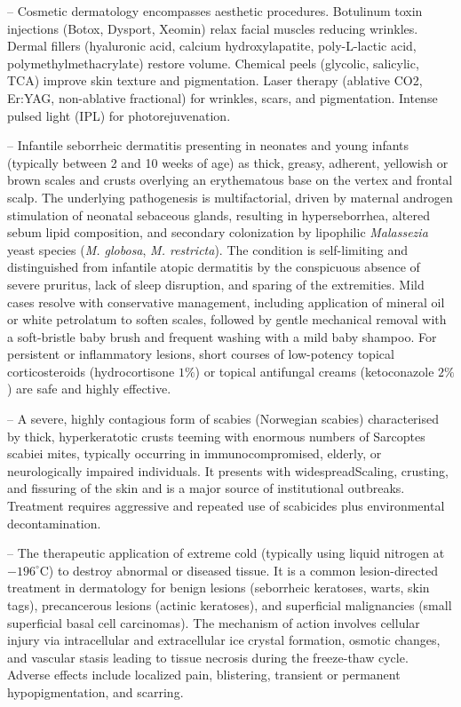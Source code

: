 -- Cosmetic dermatology encompasses aesthetic procedures. Botulinum toxin injections (Botox, Dysport, Xeomin) relax facial muscles reducing wrinkles. Dermal fillers (hyaluronic acid, calcium hydroxylapatite, poly-L-lactic acid, polymethylmethacrylate) restore volume. Chemical peels (glycolic, salicylic, TCA) improve skin texture and pigmentation. Laser therapy (ablative CO2, Er:YAG, non-ablative fractional) for wrinkles, scars, and pigmentation. Intense pulsed light (IPL) for photorejuvenation.

-- Infantile seborrheic dermatitis presenting in neonates and young infants (typically between 2 and 10 weeks of age) as thick, greasy, adherent, yellowish or brown scales and crusts overlying an erythematous base on the vertex and frontal scalp. The underlying pathogenesis is multifactorial, driven by maternal androgen stimulation of neonatal sebaceous glands, resulting in hyperseborrhea, altered sebum lipid composition, and secondary colonization by lipophilic \textit{Malassezia} yeast species (\textit{M. globosa}, \textit{M. restricta}). The condition is self-limiting and distinguished from infantile atopic dermatitis by the conspicuous absence of severe pruritus, lack of sleep disruption, and sparing of the extremities. Mild cases resolve with conservative management, including application of mineral oil or white petrolatum to soften scales, followed by gentle mechanical removal with a soft-bristle baby brush and frequent washing with a mild baby shampoo. For persistent or inflammatory lesions, short courses of low-potency topical corticosteroids (hydrocortisone $1\%$) or topical antifungal creams (ketoconazole $2\%$) are safe and highly effective.

-- A severe, highly contagious form of scabies (Norwegian scabies) characterised by thick, hyperkeratotic crusts teeming with enormous numbers of Sarcoptes scabiei mites, typically occurring in immunocompromised, elderly, or neurologically impaired individuals. It presents with widespreadScaling, crusting, and fissuring of the skin and is a major source of institutional outbreaks. Treatment requires aggressive and repeated use of scabicides plus environmental decontamination.

-- The therapeutic application of extreme cold (typically using liquid nitrogen at $-196^\circ\text{C}$) to destroy abnormal or diseased tissue. It is a common lesion-directed treatment in dermatology for benign lesions (seborrheic keratoses, warts, skin tags), precancerous lesions (actinic keratoses), and superficial malignancies (small superficial basal cell carcinomas). The mechanism of action involves cellular injury via intracellular and extracellular ice crystal formation, osmotic changes, and vascular stasis leading to tissue necrosis during the freeze-thaw cycle. Adverse effects include localized pain, blistering, transient or permanent hypopigmentation, and scarring.

